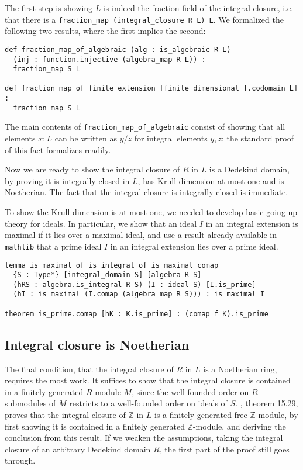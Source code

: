 \documentclass{lipics-v2021}
\newcommand{\lean}[1]{\texttt{#1}\xspace} %
\newcommand{\mathlib}{\texttt{mathlib}\xspace}
\newcommand{\Z}{\mathbb{Z}}
\begin{document}
The first step is showing $L$ is indeed the fraction field of the integral closure,
i.e. that there is a \lean{fraction\_map (integral\_closure R L) L}.
We formalized the following two results, where the first implies the second:
\begin{lstlisting}
def fraction_map_of_algebraic (alg : is_algebraic R L)
  (inj : function.injective (algebra_map R L)) :
  fraction_map S L

def fraction_map_of_finite_extension [finite_dimensional f.codomain L] :
  fraction_map S L
\end{lstlisting}
The main contents of \lean{fraction\_map\_of\_algebraic} consist of showing that all elements $x : L$ can be written as $y / z$ for integral elements $y, z$;
the standard proof of this fact formalizes readily. %

Now we are ready to show the integral closure of $R$ in $L$ is a Dedekind domain,
by proving it is integrally closed in $L$, has Krull dimension at most one and is Noetherian.
The fact that the integral closure is integrally closed is immediate.

To show the Krull dimension is at most one, we needed to develop basic going-up theory for ideals.
In particular, we show that an ideal $I$ in an integral extension is maximal if it lies over a maximal ideal,
and use a result already available in \mathlib that a prime ideal $I$ in an integral extension lies over a prime ideal.
\begin{lstlisting}
lemma is_maximal_of_is_integral_of_is_maximal_comap
  {S : Type*} [integral_domain S] [algebra R S]
  (hRS : algebra.is_integral R S) (I : ideal S) [I.is_prime]
  (hI : is_maximal (I.comap (algebra_map R S))) : is_maximal I

theorem is_prime.comap [hK : K.is_prime] : (comap f K).is_prime
\end{lstlisting}

\subsection{Integral closure is Noetherian}
The final condition, that the integral closure of $R$ in $L$ is a Noetherian ring, requires the most work.
It suffices to show that the integral closure is contained in a finitely generated $R$-module $M$,
since the well-founded order on $R$-submodules of $M$ restricts to a well-founded order on ideals of $S$.
\cite{Dummit-and-Foote}, theorem 15.29, proves that the integral closure of $\Z$ in $L$ is a finitely generated free $\Z$-module,
by first showing it is contained in a finitely generated $\Z$-module, and deriving the conclusion from this result.
If we weaken the assumptions, taking the integral closure of an arbitrary Dedekind domain $R$,
the first part of the proof still goes through.
\end{document}

